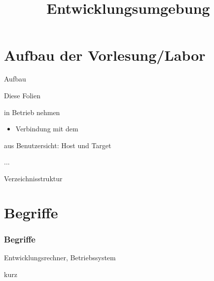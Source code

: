 
\title[Entwicklungsumgebung]{Entwicklungsumgebung}
\frame{\titlepage}

\section{Aufbau der Vorlesung/Labor}
\begin{frame}{Aufbau}
 \begin{description}
  \item[0-intro] Diese Folien
  \item[1-setup] \beaglebone in Betrieb nehmen
  \begin{itemize}
   \item Verbindung mit dem \host
  \end{itemize}
  \item[2-unix-use] \unix aus Benutzersicht: Host und Target
  \item ...
 \end{description}
\end{frame}

\begin{frame}{Verzeichnisstruktur}
\end{frame}

\section{Begriffe}
\begin{frame}
 \frametitle{Begriffe}
 \begin{description}[Target]
  \item[Host] Entwicklungsrechner, \linux Betriebssystem
  \item[Target] \target kurz \targetS 
 \end{description}
\end{frame}

